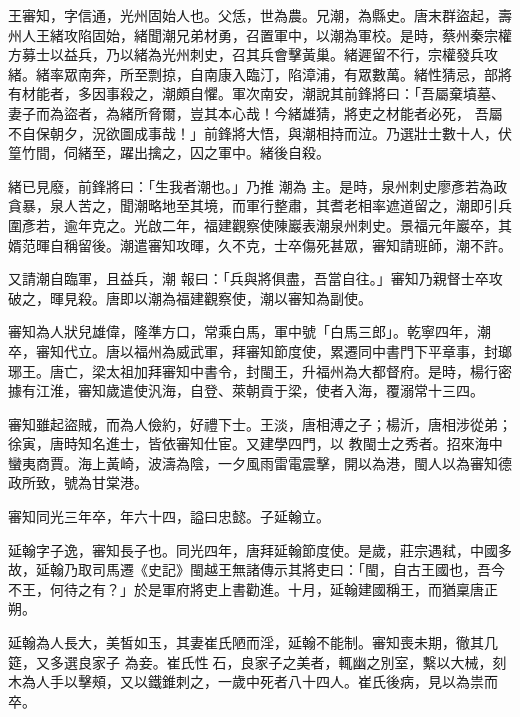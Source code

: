 
\begin{pinyinscope}

 王審知，字信通，光州固始人也。父恁，世為農。兄潮，為縣史。唐末群盜起，壽州人王緒攻陷固始，緒聞潮兄弟材勇，召置軍中，以潮為軍校。是時，蔡州秦宗權方募士以益兵，乃以緒為光州刺史，召其兵會擊黃巢。緒遲留不行，宗權發兵攻緒。緒率眾南奔，所至剽掠，自南康入臨汀，陷漳浦，有眾數萬。緒性猜忌，部將有材能者，多因事殺之，潮頗自懼。軍次南安，潮說其前鋒將曰：「吾屬棄墳墓、妻子而為盜者，為緒所脅爾，豈其本心哉！今緒雄猜，將吏之材能者必死，
 吾屬不自保朝夕，況欲圖成事哉！」前鋒將大悟，與潮相持而泣。乃選壯士數十人，伏篁竹間，伺緒至，躍出擒之，囚之軍中。緒後自殺。



 緒已見廢，前鋒將曰：「生我者潮也。」乃推
 潮為
 主。是時，泉州刺史廖彥若為政貪暴，泉人苦之，聞潮略地至其境，而軍行整肅，其耆老相率遮道留之，潮即引兵圍彥若，逾年克之。光啟二年，福建觀察使陳巖表潮泉州刺史。景福元年巖卒，其婿范暉自稱留後。潮遣審知攻暉，久不克，士卒傷死甚眾，審知請班師，潮不許。



 又請潮自臨軍，且益兵，潮
 報曰：「兵與將俱盡，吾當自往。」審知乃親督士卒攻破之，暉見殺。唐即以潮為福建觀察使，潮以審知為副使。



 審知為人狀兒雄偉，隆準方口，常乘白馬，軍中號「白馬三郎」。乾寧四年，潮卒，審知代立。唐以福州為威武軍，拜審知節度使，累遷同中書門下平章事，封瑯琊王。唐亡，梁太祖加拜審知中書令，封閩王，升福州為大都督府。是時，楊行密據有江淮，審知歲遣使汎海，自登、萊朝貢于梁，使者入海，覆溺常十三四。



 審知雖起盜賊，而為人儉約，好禮下士。王淡，唐相溥之子；楊沂，唐相涉從弟；徐寅，唐時知名進士，皆依審知仕宦。又建學四門，以
 教閩士之秀者。招來海中蠻夷商賈。海上黃崎，波濤為陰，一夕風雨雷電震擊，開以為港，閩人以為審知德政所致，號為甘棠港。



 審知同光三年卒，年六十四，謚曰忠懿。子延翰立。



 延翰字子逸，審知長子也。同光四年，唐拜延翰節度使。是歲，莊宗遇弒，中國多故，延翰乃取司馬遷《史記》閩越王無諸傳示其將吏曰：「閩，自古王國也，吾今不王，何待之有？」於是軍府將吏上書勸進。十月，延翰建國稱王，而猶稟唐正朔。



 延翰為人長大，美皙如玉，其妻崔氏陋而淫，延翰不能制。審知喪未期，徹其几筵，又多選良家子
 為妾。崔氏性石，良家子之美者，輒幽之別室，繫以大械，刻木為人手以擊頰，又以鐵錐刺之，一歲中死者八十四人。崔氏後病，見以為祟而卒。




\end{pinyinscope}
